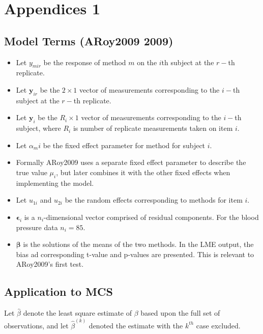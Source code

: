 \documentclass[12pt, a4paper]{report}
\theoremstyle{plain}
\theoremstyle{definition}
\theoremstyle{remark}
\begin{document}
	
	
	\chapter{Appendices 1}
	
	
	\section{Model Terms (ARoy2009 2009)}
	\begin{itemize}
		\item Let $y_{mir}$ be the response of method $m$ on the $i$th subject
		at the $r-$th replicate.
		\item Let $\boldsymbol{y}_{ir}$ be the $2 \times 1$ vector of measurements
		corresponding to the $i-$th subject at the $r-$th replicate.
		\item Let $\boldsymbol{y}_{i}$ be the $R_i \times 1$ vector of
		measurements corresponding to the $i-$th subject, where $R_i$ is number of replicate measurements taken on item $i$.
		\item Let $\alpha_mi$ be the fixed effect parameter for method for subject $i$.
		\item Formally ARoy2009 uses a separate fixed effect parameter to describe the true value $\mu_i$, but later combines it with the other fixed effects when implementing the model.
		\item Let $u_{1i}$ and $u_{2i}$ be the random effects corresponding to methods for item $i$.
		
		\item $\boldsymbol{\epsilon}_{i}$ is a $n_{i}$-dimensional vector
		comprised of residual components. For the blood pressure data $n_{i} = 85$.
		
		\item $\boldsymbol{\beta}$ is the solutions of the means of the two methods. In the LME output, the bias ad corresponding
		t-value and p-values are presented. This is relevant to ARoy2009's first test.\end{itemize}
	
	
	
	\section{Application to MCS} %
	
	Let $\hat{\beta}$ denote the least square estimate of $\beta$
	based upon the full set of observations, and let
	$\hat{\beta}^{(k)}$ denoted the estimate with the $k^{th}$ case
	excluded.
	
\end{document}
